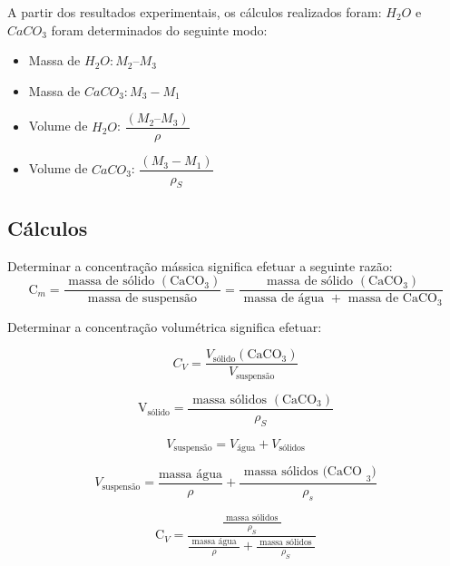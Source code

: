 A partir dos resultados experimentais, os cálculos realizados foram: $ H_{2}O $ e $ CaCO_{3} $ foram determinados do seguinte modo:


\begin{itemize}
\item Massa de $ H_{2}O: M_{2} – M_{3} $
\item Massa de $ CaCO_{3}: M_{3}-M_{1} $
\item Volume de $ H_{2}O $: $\dfrac{(M_{2} – M_{3})}{\rho}$
\item Volume de $ CaCO_{3} $:  $\dfrac{(M_{3}-M_{1})}{\rho_{S}}$
\end{itemize}

\subsection{Cálculos}

Determinar a concentração mássica significa efetuar a seguinte razão:
\begin{equation}\label{key}
\mathrm{C}_{m}=\frac{\text { massa de sólido }\left(\mathrm{CaCO}_{3}\right)}{\text { massa de suspensão }}=\frac{\text { massa de sólido }\left(\mathrm{CaCO}_{3}\right)}{\text { massa de água }+\text { massa de } \mathrm{CaCO}_{3}}
\end{equation}


Determinar a concentração volumétrica significa efetuar:

\begin{equation}\label{key}
C_{V}=\frac{ V_{\text{sólido}} \left(\mathrm{CaCO}_{3}\right)}{V_{\text{suspensão}}}
\end{equation}


\begin{equation}\label{key}
\mathrm{V}_{ \text {sólido}}=\frac{\text { massa sólidos }\left(\mathrm{CaCO}_{3}\right)}{\rho_{S}}
\end{equation}


\begin{equation}\label{key}
V_{\text{suspensão}} = V_{\text{água}}+V_{\text{sólidos}}
\end{equation}


\begin{equation}\label{key}
V_{\text{suspensão}} = \dfrac{ \text{massa água} }{\rho}+\dfrac{\text { massa sólidos (CaCO }_{3} )}{\rho_{s}}
\end{equation}


\begin{equation}\label{key}
\mathrm{C}_{V}=\frac{\frac{\text { massa sólidos }}{\rho_{S}}}{\frac{\text { massa água }}{\rho}+\frac{\text { massa sólidos }}{\rho_{S}}}
\end{equation}


